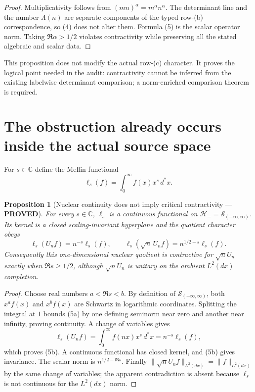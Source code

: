\documentclass[11pt]{article}
\newcommand{\PROVED}{\textcolor{green!40!black}{\textbf{PROVED}}}
\newtheorem{proposition}{Proposition}
\begin{document}
\begin{proof}
Multiplicativity follows from $(mn)^\alpha=m^\alpha n^\alpha$.  The
determinant line and the number $\Lambda(n)$ are separate components of the
typed row-(b) correspondence, so (4) does not alter them.  Formula (5) is
the scalar operator norm.  Taking $\Re\alpha>1/2$ violates contractivity
while preserving all the stated algebraic and scalar data.
\end{proof}

This proposition does not modify the actual row-(c) character.  It proves
the logical point needed in the audit: contractivity cannot be inferred
from the existing labelwise determinant comparison; a norm-enriched
comparison theorem is required.

\section{The obstruction already occurs inside the actual source space}

For $s\in\mathbb C$ define the Mellin functional
\begin{equation}
             \ell_s(f)=\int_0^\infty f(x)x^s\,d^*x.             \tag{5a}
\end{equation}

\begin{proposition}[Nuclear continuity does not imply critical
contractivity --- \PROVED]
For every $s\in\mathbb C$, $\ell_s$ is a continuous functional on
$\mathcal H_-=\mathcal S_{(-\infty,\infty)}$.  Its kernel is a closed
scaling-invariant hyperplane and the quotient character obeys
\begin{equation}
 \ell_s(U_nf)=n^{-s}\ell_s(f),\qquad
 \ell_s(\sqrt n\,U_nf)=n^{1/2-s}\ell_s(f).           \tag{5b}
\end{equation}
Consequently this one-dimensional nuclear quotient is contractive for
$\sqrt nU_n$ exactly when $\Re s\ge1/2$, although $\sqrt nU_n$ is unitary
on the ambient $L^2(dx)$ completion.
\end{proposition}

\begin{proof}
Choose real numbers $a<\Re s<b$.  By definition of
$\mathcal S_{(-\infty,\infty)}$, both $x^af(x)$ and $x^bf(x)$ are Schwartz
in logarithmic coordinates.  Splitting the integral at $1$ bounds (5a) by
one defining seminorm near zero and another near infinity, proving
continuity.  A change of variables gives
\[
 \ell_s(U_nf)=\int_0^\infty f(nx)x^s\,d^*x
 =n^{-s}\ell_s(f),
\]
which proves (5b).  A continuous functional has closed kernel, and (5b)
gives invariance.  The scalar norm is $n^{1/2-\Re s}$.  Finally
$\|\sqrt nU_nf\|_{L^2(dx)}=\|f\|_{L^2(dx)}$ by the same change of variables;
the apparent contradiction is absent because $\ell_s$ is not continuous
for the $L^2(dx)$ norm.
\end{proof}
\end{document}
